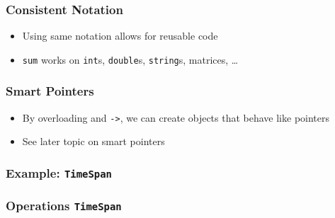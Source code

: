 \begin{frame}
  \frametitle{Consistent Notation}
  \begin{itemize}
    \item Using same notation allows for reusable code
    \item {\tt sum} works on {\tt int}s, {\tt double}s, {\tt string}s, matrices, \dots
  \end{itemize}
\end{frame}

\begin{frame}
  \frametitle{Smart Pointers}
  \begin{itemize}
    \item By overloading {\tt *} and {\tt ->}, we can
          create objects that behave like pointers
    \item See later topic on smart pointers
  \end{itemize}
\end{frame}

\begin{frame}
  \frametitle{Example: {\tt TimeSpan}}
\end{frame}

\begin{frame}
  \frametitle{Operations {\tt TimeSpan}}
\end{frame}

